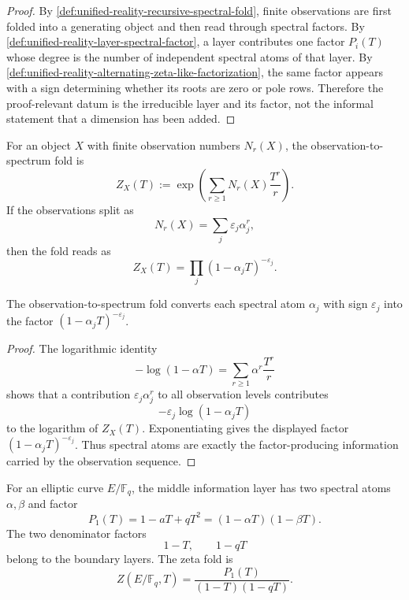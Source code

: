 \begin{proof}
By
\autoref{def:unified-reality-recursive-spectral-fold}, finite
observations are first folded into a generating object and then read
through spectral factors.  By
\autoref{def:unified-reality-layer-spectral-factor}, a layer contributes
one factor $P_i(T)$ whose degree is the number of independent spectral
atoms of that layer.  By
\autoref{def:unified-reality-alternating-zeta-like-factorization}, the
same factor appears with a sign determining whether its roots are zero
or pole rows.  Therefore the proof-relevant datum is the irreducible
layer and its factor, not the informal statement that a dimension has
been added.
\end{proof}

\begin{definition}
\label{def:unified-reality-observation-spectrum-exponential-fold}
For an object $X$ with finite observation numbers $N_r(X)$, the
observation-to-spectrum fold is
$$
Z_X(T)
:=
\exp\left(
\sum_{r\ge1} N_r(X)\frac{T^r}{r}
\right).
$$
If the observations split as
$$
N_r(X)=\sum_j \varepsilon_j\alpha_j^r,
$$
then the fold reads as
$$
Z_X(T)=\prod_j(1-\alpha_jT)^{-\varepsilon_j}.
$$
\end{definition}

\begin{theorem}
\label{thm:unified-reality-exponential-fold-spectral-atoms-factors}
The observation-to-spectrum fold converts each spectral atom
$\alpha_j$ with sign $\varepsilon_j$ into the factor
$(1-\alpha_jT)^{-\varepsilon_j}$.
\end{theorem}

\begin{proof}
The logarithmic identity
$$
-\log(1-\alpha T)
=
\sum_{r\ge1}\alpha^r\frac{T^r}{r}
$$
shows that a contribution $\varepsilon_j\alpha_j^r$ to all observation
levels contributes
$$
-\varepsilon_j\log(1-\alpha_jT)
$$
to the logarithm of $Z_X(T)$.  Exponentiating gives the displayed factor
$(1-\alpha_jT)^{-\varepsilon_j}$.  Thus spectral atoms are exactly the
factor-producing information carried by the observation sequence.
\end{proof}

\begin{definition}
\label{def:unified-reality-elliptic-finite-field-middle-layer}
For an elliptic curve $E/\mathbb F_q$, the middle information layer has
two spectral atoms $\alpha,\beta$ and factor
$$
P_1(T)=1-aT+qT^2=(1-\alpha T)(1-\beta T).
$$
The two denominator factors
$$
1-T,
\qquad
1-qT
$$
belong to the boundary layers.  The zeta fold is
$$
Z(E/\mathbb F_q,T)
=
\frac{P_1(T)}{(1-T)(1-qT)}.
$$
\end{definition}


